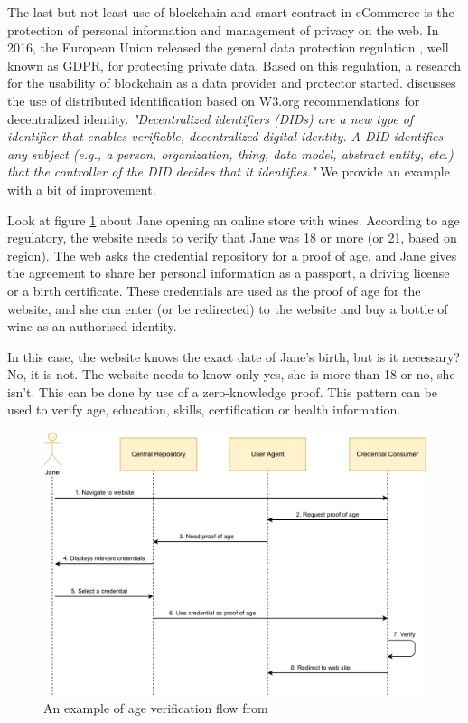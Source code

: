 \documentclass[thesis=M,english]{FITthesis}[2019/12/23]
\begin{document}
The last but not least use of blockchain and smart contract in eCommerce is the protection of personal information and management of privacy on the web. In 2016, the European Union released the general data protection regulation \cite{gdpr}, well known as GDPR, for protecting private data. Based on this regulation, a research for the usability of blockchain as a data provider and protector started. \cite{eidas} discusses the use of distributed identification based on W3.org recommendations for decentralized identity. \emph{"Decentralized identifiers (DIDs) are a new type of identifier that enables verifiable, decentralized digital identity. A DID identifies any subject (e.g., a person, organization, thing, data model, abstract entity, etc.) that the controller of the DID decides that it identifies."}\cite{w3}  We provide an example with a bit of improvement.

Look at figure \ref{fig:Verification flow} about Jane opening an online store with wines. According to age regulatory, the website needs to verify that Jane was 18 or more (or 21, based on region). The web asks the credential repository for a proof of age, and Jane gives the agreement to share her personal information as a passport, a driving license or a birth certificate. These credentials are used as the proof of age for the website, and she can enter (or be redirected) to the website and buy a bottle of wine as an authorised identity.

In this case, the website knows the exact date of Jane's birth, but is it necessary? No, it is not. The website needs to know only yes, she is more than 18 or no, she isn't.  This can be done by use of a zero-knowledge proof. This pattern can be used to verify age, education, skills, certification or health information. 

\begin{figure}[ht!]
    \centering
    \includegraphics[width=\textwidth]{assets/informationFlow.pdf}
    \caption{An example of age verification flow from \cite{eidas}}
    \label{fig:Verification flow}
\end{figure}
\end{document}
